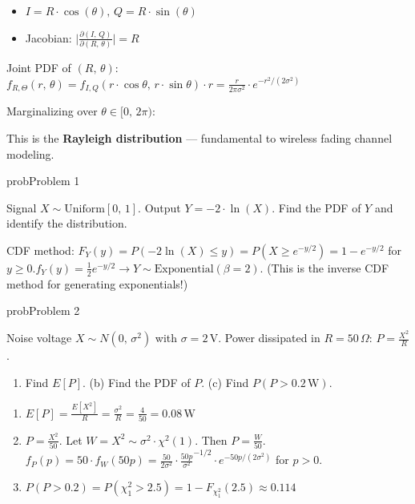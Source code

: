 \begin{itemize}
\tightlist
\item
  $I = R \cdot \cos (\theta),\, Q = R \cdot \sin (\theta)$
\item
  Jacobian: $\lvert \frac{\partial (I,\,Q)}{\partial (R,\,\theta)}\rvert = R$
\end{itemize}

Joint PDF of $(R,\, \theta)$:\PSbr{}$\displaystyle f_{R,\Theta}(r,\,\theta) = f_{I,Q}(r \cdot \cos \theta,\, r \cdot \sin \theta) \cdot r = \frac{r}{2\pi \sigma^{2}} \cdot e^{-r^{2}/(2\sigma^{2})}$

Marginalizing over $\theta \in [0,\, 2\pi)$:


This is the \textbf{Rayleigh distribution} — fundamental to wireless fading channel modeling.


\begin{PSbox}[unbreakable]{prob}{Problem 1}

Signal $X \sim \mathrm{Uniform}[0,\, 1]$. Output $Y = -2 \cdot \ln (X)$. Find the PDF of $Y$ and identify the distribution.

\PSsolution{} CDF method: $F_{Y}(y) = P(-2\ln (X) \le y) = P(X \ge e^{-y/2}) = 1 - e^{-y/2}$ for $y \ge 0$.\PSbr{}$f_{Y}(y) = \frac{1}{2}e^{-y/2} \to Y \sim \mathrm{Exponential}(\beta = 2)$. (This is the inverse CDF method for generating exponentials!)

\end{PSbox}

\begin{PSbox}[unbreakable]{prob}{Problem 2}

Noise voltage $X \sim N(0,\, \sigma^{2})$ with $\sigma = 2\,\mathrm{V}$. Power dissipated in $R = 50\,\Omega$: $P = \frac{X^{2}}{R}$.

\begin{enumerate}
\def\labelenumi{(\alph{enumi})}
\tightlist
\item
  Find $E[P]$. (b) Find the PDF of $P$. (c) Find $P(P > 0.2\,\mathrm{W})$.
\end{enumerate}

\PSsolution{} 

\begin{enumerate}
\def\labelenumi{(\alph{enumi})}
\tightlist
\item
  $\displaystyle E[P] = \frac{E[X^{2}]}{R} = \frac{\sigma^{2}}{R} = \frac{4}{50} = 0.08\,\mathrm{W}$
\item
  $P = \frac{X^{2}}{50}$. Let $W = X^{2} \sim \sigma^{2} \cdot \chi^{2}(1)$. Then $P = \frac{W}{50}$. $f_{P}(p) = 50 \cdot f_{W}(50p) = \frac{50}{2\sigma^{2}} \cdot \frac{50p}{\sigma^{2}}^{-1/2} \cdot e^{-50p/(2\sigma^{2})}$ for $p > 0$.
\item
  $P(P > 0.2) = P(\chi^2_1 > 2.5) = 1 - F_{\chi^2_1}(2.5) \approx 0.114$
\end{enumerate}

\end{PSbox}

